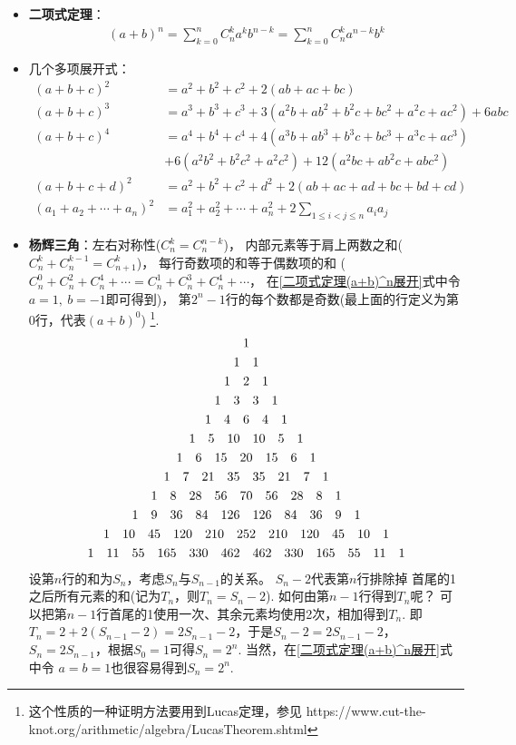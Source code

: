 \begin{itemize}[leftmargin=\inteval{\myitemleftmargin}pt,itemsep=
   \inteval{\myitemitempsep}pt,topsep=\inteval{\myitemtopsep}pt]
\item \textbf{二项式定理}：
\begin{gather}\label{二项式定理(a+b)^n展开}
    (a+b)^n=\sum\limits_{k=0}^nC_n^ka^kb^{n-k}=
    \sum\limits_{k=0}^nC_n^ka^{n-k}b^k
\end{gather}
\item 几个多项展开式：
\begin{align*}
    (a+b+c)^2 &=a^2+b^2+c^2+2(ab+ac+bc) \\
    (a+b+c)^3 &=a^3+b^3+c^3+3(a^2b+ab^2+b^2c+bc^2+a^2c+ac^2)+6abc \\
    (a+b+c)^4 &=a^4+b^4+c^4+4(a^3b+ab^3+b^3c+bc^3+a^3c+ac^3) \\
    &+6(a^2b^2+b^2c^2+a^2c^2)+12(a^2bc+ab^2c+abc^2) \\
    (a+b+c+d)^2 &=a^2+b^2+c^2+d^2+2(ab+ac+ad+bc+bd+cd) \\
    (a_1+a_2+\cdots+a_n)^2 &=a_1^2+a_2^2+\cdots+a_n^2+
    2\sum_{1\leq i<j\leq n}a_ia_j 
\end{align*}
\item \textbf{杨辉三角}：左右对称性($C_n^k=C_n^{n-k}$)，
内部元素等于肩上两数之和($C_n^k+C_n^{k-1}=C_{n+1}^k$)，
每行奇数项的和等于偶数项的和
($C_n^0+C_n^2+C_n^4+\cdots=C_n^1+C_n^3+C_n^4+\cdots$，
在\eqref{二项式定理(a+b)^n展开}式中令$a=1,\ b=-1$即可得到)，
第$2^n-1$行的每个数都是奇数(最上面的行定义为第0行，代表$(a+b)^0$)
\footnote{这个性质的一种证明方法要用到Lucas定理，参见
https://www.cut-the-knot.org/arithmetic/algebra/LucasTheorem.shtml}.
\begin{gather*}
    1 \\
    1\quad 1 \\
    1\quad 2 \quad 1 \\   
    1\quad 3 \quad 3 \quad 1 \\
    1\quad 4 \quad 6 \quad 4 \quad 1 \\
    1\quad 5 \quad 10 \quad 10 \quad 5 \quad 1 \\
    1\quad 6 \quad 15 \quad 20 \quad 15 \quad 6 \quad 1  \\ 
    1\quad 7 \quad 21 \quad 35 \quad 35 \quad 21 \quad 7 \quad 1  \\ 
    1\quad 8 \quad 28 \quad 56 \quad 70 \quad 56 \quad 28 \quad 8 \quad 1  \\ 
    1\quad 9 \quad 36 \quad 84 \quad 126 \quad 126 \quad 84 \quad 36 \quad 9 \quad 1  \\ 
    1\quad 10 \quad 45 \quad 120 \quad 210 \quad 252 \quad 210 \quad 120 \quad 45 \quad 10 \quad 1  \\ 
    1\quad 11 \quad 55 \quad 165 \quad 330 \quad 462 \quad 462 \quad 330 \quad 165 \quad 55 \quad 11 \quad 1 
\end{gather*}
设第$n$行的和为$S_n$，考虑$S_n$与$S_{n-1}$的关系。 $S_n-2$代表第$n$行排除掉
首尾的1之后所有元素的和(记为$T_n$，则$T_n=S_n-2$). 
如何由第$n-1$行得到$T_n$呢？
可以把第$n-1$行首尾的1使用一次、其余元素均使用2次，相加得到$T_n$.
即 $T_n=2+2(S_{n-1}-2)=2S_{n-1}-2$，于是$ S_n-2=2S_{n-1}-2 $，
$ S_n=2S_{n-1} $，根据$S_0=1$可得$S_n=2^n$. 
当然，在\eqref{二项式定理(a+b)^n展开}式中令
$a=b=1$也很容易得到$S_n=2^n$. 


\end{itemize}
